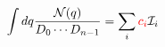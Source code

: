 \documentclass[10pt]{article}
\begin{document}
\[
\int dq \frac{\mathcal{N}(q)}{D_0 \cdots D_{n-1}}
=
\sum_i \textcolor{red}{c_i} \mathcal{I}_i
\]
\end{document}
